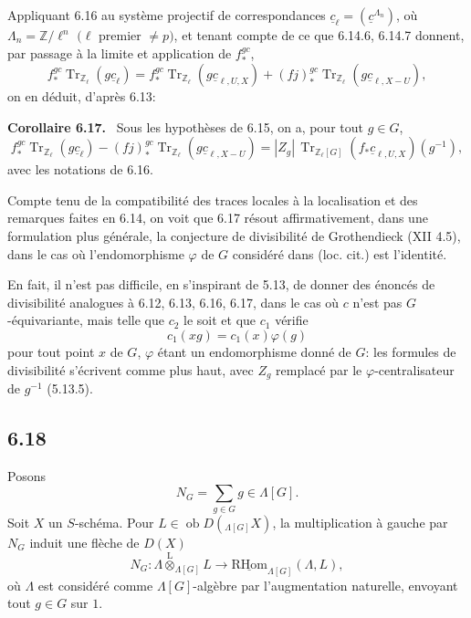 \documentclass[11pt]{article}
\newenvironment{statement}[1]{\par\medskip\noindent\textbf{#1.}\ }{\par\medskip}
\newcommand{\R}{\mathrm{R}}\newcommand{\RHomCore}{\mathrm{RHom}}
\providecommand{\RHom}{\RHomCore}
\providecommand{\uRHom}{\underline{\RHom}}
\providecommand{\Tr}{\operatorname{Tr}}
\providecommand{\Tr}{\operatorname{Tr}}
\providecommand{\lten}{\overset{\mathrm L}{\otimes}}
\providecommand{\Ob}{\operatorname{ob}}
\providecommand{\Tr}{\operatorname{Tr}}
\providecommand{\RHom}{\RHomCore}
\providecommand{\lten}{\overset{\mathrm L}{\otimes}}
\providecommand{\RHom}{\R\mathcal{H}om}
\providecommand{\lten}{\overset{\mathrm L}{\otimes}}
\providecommand{\Ob}{\operatorname{ob}}
\providecommand{\R}{\mathrm R}
\providecommand{\Tr}{\operatorname{Tr}}
\providecommand{\lten}{\overset{\mathrm L}{\otimes}}
\providecommand{\lten}{\overset{\mathrm L}{\otimes}}
\providecommand{\Ob}{\operatorname{Ob}}
\providecommand{\lten}{\overset{\mathrm L}{\otimes}}
\providecommand{\RHom}{\RHomCore}
\providecommand{\Tr}{\operatorname{Tr}}
\providecommand{\Ob}{\operatorname{ob}}
\providecommand{\Ob}{\operatorname{Ob}}
\providecommand{\lten}{\overset{\mathrm L}{\otimes}}
\begin{document}
Appliquant 6.16 au système projectif de correspondances $\underline c_{\ell}=(\underline c^{\Lambda_n})$, où $\Lambda_n=\mathbb Z/\ell^n$ $(\ell$ premier $\ne p)$, et tenant compte de ce que 6.14.6, 6.14.7 donnent, par passage à la limite et application de $f_*^{gc}$,
\[
f_*^{gc}\Tr_{\mathbb Z_{\ell}}(g\underline c_{\ell})
=
f_*^{gc}\Tr_{\mathbb Z_{\ell}}(g\underline c_{\ell,U,X})
+(fj)_*^{gc}\Tr_{\mathbb Z_{\ell}}(g\underline c_{\ell,X-U}),
\]
on en déduit, d'après 6.13:

\begin{statement}{Corollaire 6.17}
Sous les hypothèses de 6.15, on a, pour tout $g\in G$,
\begin{equation}
f_*^{gc}\Tr_{\mathbb Z_{\ell}}(g\underline c_{\ell})
-(fj)_*^{gc}\Tr_{\mathbb Z_{\ell}}(g\underline c_{\ell,X-U})
=
|Z_g|\,\Tr_{\mathbb Z_{\ell}[G]}(f_*\underline c_{\ell,U,X})(g^{-1}),
\tag{6.17.1}
\end{equation}
avec les notations de 6.16.
\end{statement}

Compte tenu de la compatibilité des traces locales à la localisation et des remarques faites en 6.14, on voit que 6.17 résout affirmativement, dans une formulation plus générale, la conjecture de divisibilité de Grothendieck (XII 4.5), dans le cas où l'endomorphisme $\varphi$ de $G$ considéré dans (loc. cit.) est l'identité.

En fait, il n'est pas difficile, en s'inspirant de 5.13, de donner des énoncés de divisibilité analogues à 6.12, 6.13, 6.16, 6.17, dans le cas où $c$ n'est pas $G$-équivariante, mais telle que $c_2$ le soit et que $c_1$ vérifie
\[
c_1(xg)=c_1(x)\varphi(g)
\]
pour tout point $x$ de $G$, $\varphi$ étant un endomorphisme donné de $G$: les formules de divisibilité s'écrivent comme plus haut, avec $Z_g$ remplacé par le $\varphi$-centralisateur de $g^{-1}$ (5.13.5).

\subsection*{6.18}
Posons
\begin{equation}
N_G=\sum_{g\in G} g\in\Lambda[G].
\tag{6.18.1}
\end{equation}
Soit $X$ un $S$-schéma. Pour $L\in\Ob D({}_{\Lambda[G]}X)$, la multiplication à gauche par $N_G$ induit une flèche de $D(X)$
\begin{equation}
N_G:\Lambda\lten_{\Lambda[G]}L
\longrightarrow
\uRHom_{\Lambda[G]}(\Lambda,L),
\tag{6.18.2}
\end{equation}
où $\Lambda$ est considéré comme $\Lambda[G]$-algèbre par l'augmentation naturelle, envoyant tout $g\in G$ sur $1$.
\end{document}
